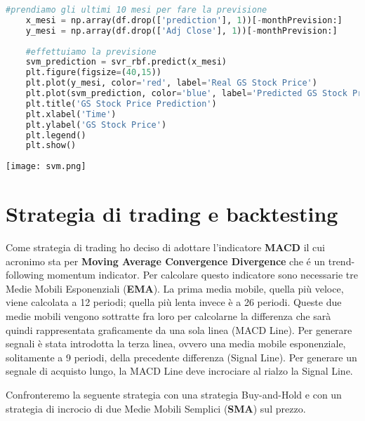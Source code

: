 \documentclass{report}
\begin{document}
\begin{lstlisting}[language=python]
    #prendiamo gli ultimi 10 mesi per fare la previsione
    x_mesi = np.array(df.drop(['prediction'], 1))[-monthPrevision:]
    y_mesi = np.array(df.drop(['Adj Close'], 1))[-monthPrevision:]
    
    #effettuiamo la previsione
    svm_prediction = svr_rbf.predict(x_mesi)
    plt.figure(figsize=(40,15))
    plt.plot(y_mesi, color='red', label='Real GS Stock Price')
    plt.plot(svm_prediction, color='blue', label='Predicted GS Stock Price')
    plt.title('GS Stock Price Prediction')
    plt.xlabel('Time')
    plt.ylabel('GS Stock Price')
    plt.legend()
    plt.show()
\end{lstlisting}
\texttt{[image: svm.png]}

\chapter{Strategia di trading e backtesting}
Come strategia di trading ho deciso di adottare l'indicatore \textbf{MACD} il cui acronimo sta per \textbf{Moving Average Convergence Divergence} che é un trend-following momentum indicator. Per calcolare questo indicatore sono necessarie tre Medie Mobili Esponenziali (\textbf{EMA}). La prima media mobile, quella più veloce, viene calcolata a 12 periodi; quella più lenta invece è a 26 periodi. Queste due medie mobili vengono sottratte fra loro per calcolarne la differenza che sarà quindi rappresentata graficamente da una sola linea (MACD Line). Per generare segnali è stata introdotta la terza linea, ovvero una media mobile esponenziale, solitamente a 9 periodi, della precedente differenza (Signal Line). Per generare un segnale di acquisto lungo, la MACD Line deve incrociare al rialzo la Signal Line.

Confronteremo la seguente strategia con una strategia Buy-and-Hold e con un strategia di incrocio di due Medie Mobili Semplici (\textbf{SMA}) sul prezzo. 
\end{document}
